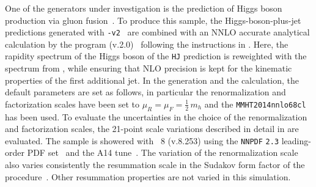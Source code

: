 \subsubsection{\hjetscompPowheg \hjetscompNNLOPS}
\label{sec:hjetscomp:tools:nnlops:powheg}

One of the generators under investigation is the \hjetscompNNLOPS prediction 
of Higgs boson production via gluon fusion~\cite{Hamilton:2013fea}.
To produce this sample, the Higgs-boson-plus-jet \hjetscompMinlo~\cite{Hamilton:2012np} 
predictions generated with \hjetscompPowhegBox{}\texttt{-v2}~\cite{Campbell:2012am} 
are combined with an NNLO accurate analytical calculation by the 
program \hjetscompHNNLO (v.2.0)~\cite{Catani:2007vq,Grazzini:2008tf,Grazzini:2013mca} 
following the instructions in \cite{Hamilton:2013fea}. Here, the rapidity 
spectrum of the Higgs boson of the \hjetscompPowheg \texttt{HJ} \hjetscompMinlo prediction 
is reweighted with the spectrum from \hjetscompHNNLO, while ensuring that NLO 
precision is kept for the kinematic properties of the first additional jet. 
In the generation and the \hjetscompHNNLO calculation, the default parameters are 
set as follows, in particular the renormalization and factorization scales 
have been set to $\mu_R = \mu_F = \tfrac{1}{2}\,m_h$ and the 
\texttt{MMHT2014nnlo68cl} \cite{Harland-Lang:2014zoa} has been used. 
To evaluate the uncertainties in the choice of the renormalization and 
factorization scales, the 21-point scale variations described in detail 
in \cite{Hamilton:2013fea} are evaluated.
The \hjetscompNNLOPS sample is showered with \hjetscompPythia~8 (v.8.253) \cite{Sjostrand:2014zea} 
using the \texttt{NNPDF} \texttt{2.3} leading-order PDF set~\cite{Ball:2012cx} 
and the A14 tune~\cite{ATL-PHYS-PUB-2014-021}. 
The variation of the renormalization scale also varies consistently the 
resummation scale in the Sudakov form factor of the \hjetscompMinlo 
procedure~\cite{Hamilton:2012rf}. Other resummation properties are not 
varied in this simulation. 

